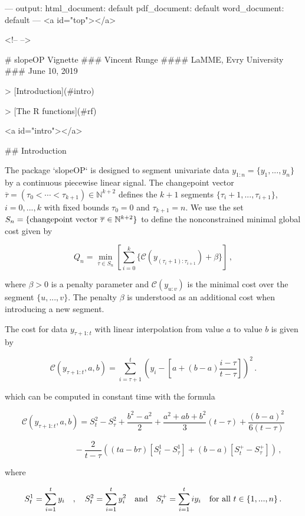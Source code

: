 ---
output:
  html_document: default
  pdf_document: default
  word_document: default
---
<a id="top"></a>

<!-- 
--> 

# slopeOP Vignette
### Vincent Runge
#### LaMME, Evry University
### June 10, 2019

> [Introduction](#intro)

> [The R functions](#rf)

<a id="intro"></a>

## Introduction

The package `slopeOP` is designed to segment univariate data $y_{1:n} = \{y_1,...,y_n\}$ by a continuous piecewise linear signal. The changepoint vector $\overline{\tau} = (\tau_0 < \cdots < \tau_{k+1}) \in \mathbb{N}^{k+2}$ defines the $k+1$ segments $\{\tau_i+1,...,\tau_{i+1}\}$, $i = 0,...,k$ with fixed bounds $\tau_0 = 0$ and  $\tau_{k+1} = n$. We use the set $S_n = \{\hbox{changepoint vector } \overline{\tau} \in \mathbb{N}^{k+2}\}$ to define the nonconstrained minimal global cost given by

$$Q_n = \min_{\overline{\tau} \in S_n}\left[ \sum_{i=0}^{k}\lbrace \mathcal{C}(y_{(\tau_i+1):\tau_{i+1}}) + \beta \rbrace \right]\,,$$

where $\beta > 0$ is a penalty parameter and $\mathcal{C}(y_{u:v})$ is the minimal cost over the segment $\{u,...,v\}$. The penalty $\beta$ is understood as an additional cost when introducing a new segment. 

The cost for data $y_{\tau+1:t}$ with linear interpolation from value $a$ to value $b$ is given by

$$
\mathcal{C}(y_{\tau+1:t},a,b) = \sum_{i=\tau+1}^{t}\left(y_i - [a + (b-a)\frac{i-\tau}{t-\tau}]\right)^2\,.
$$

which can be computed in constant time with the formula 

$$\mathcal{C}(y_{\tau+1:t},a,b) = S_{t}^2 - S_{\tau}^2 +\frac{b^2-a^2}{2} + \frac{a^2 + ab +b^2}{3}(t-\tau) + \frac{(b-a)^2}{6(t-\tau)}$$

$$\quad\quad\quad\quad\quad\quad - \frac{2}{t-\tau} \left( (ta-b\tau)[S_{t}^1 - S_{\tau}^1] + (b-a)[S_{t}^+ - S_{\tau}^+]\right)\,,$$

where

$$
S^1_t = \sum_{i=1}^t y_i\quad , \quad S^2_t = \sum_{i=1}^t y_i^2\quad \hbox{and} \quad S^+_t = \sum_{i=1}^t iy_i\quad \hbox{for all} \,\, t \in \{1,...,n\}\,.
$$

